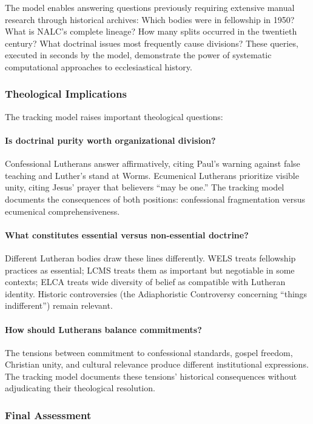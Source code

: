 The model enables answering questions previously requiring extensive manual research through historical archives: Which bodies were in fellowship in 1950? What is NALC's complete lineage? How many splits occurred in the twentieth century? What doctrinal issues most frequently cause divisions? These queries, executed in seconds by the model, demonstrate the power of systematic computational approaches to ecclesiastical history.

\subsubsection{Theological Implications}

The tracking model raises important theological questions:

\paragraph{Is doctrinal purity worth organizational division?} Confessional Lutherans answer affirmatively, citing Paul's warning against false teaching and Luther's stand at Worms. Ecumenical Lutherans prioritize visible unity, citing Jesus' prayer that believers ``may be one.'' The tracking model documents the consequences of both positions: confessional fragmentation versus ecumenical comprehensiveness.

\paragraph{What constitutes essential versus non-essential doctrine?} Different Lutheran bodies draw these lines differently. WELS treats fellowship practices as essential; LCMS treats them as important but negotiable in some contexts; ELCA treats wide diversity of belief as compatible with Lutheran identity. Historic controversies (the Adiaphoristic Controversy concerning ``things indifferent'') remain relevant.

\paragraph{How should Lutherans balance commitments?} The tensions between commitment to confessional standards, gospel freedom, Christian unity, and cultural relevance produce different institutional expressions. The tracking model documents these tensions' historical consequences without adjudicating their theological resolution.

\subsubsection{Final Assessment}

